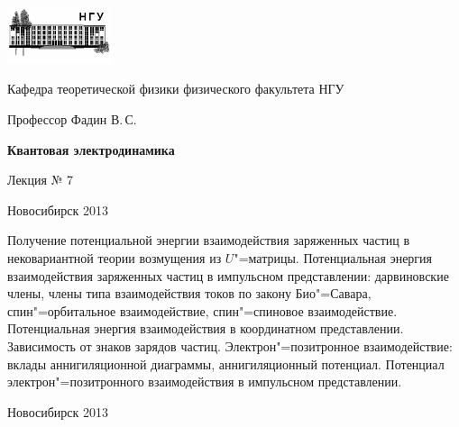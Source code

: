 \documentclass[12pt,pagesize,paper=192mm:108mm]{scrbook}
\begin{document}
\begin{titlepage}
  \vspace*{-1em}
  \begin{center}
    \includegraphics[width=0.23\textwidth]{../NSU-logo}

    Кафедра теоретической физики физического факультета НГУ
    \medskip

    \Large
    Профессор Фадин В.\,С.
    \bigskip

    \huge
    \textbf{Квантовая электродинамика}
    \bigskip

    \Large
    Лекция № 7
    \vfill

    \normalsize
    \vfill

    \normalsize \ccbysa\hspace{0.5em}  Новосибирск 2013
  \end{center}
\end{titlepage}
\vspace*{-1em}
\begin{center}
\vfill
  \begin{minipage}{0.65\linewidth}
    Получение потенциальной энергии взаимодействия заряженных частиц в
    нековариантной теории возмущения из $U$"=матрицы. Потенциальная
    энергия взаимодействия заряженных частиц в импульсном
    представлении: дарвиновские члены, члены типа взаимодействия токов
    по закону Био"=Савара, спин"=орбитальное взаимодействие,
    спин"=спиновое взаимодействие.  Потенциальная энергия
    взаимодействия в координатном представлении. Зависимость от знаков
    зарядов частиц. Электрон"=позитронное взаимодействие: вклады
    аннигиляционной диаграммы, аннигиляционный потенциал. Потенциал
    электрон"=позитронного взаимодействия в импульсном представлении.
  \end{minipage}
  \vfill

  \normalsize \ccbysa\hspace{0.5em} Новосибирск 2013
\end{center}
\end{document}
